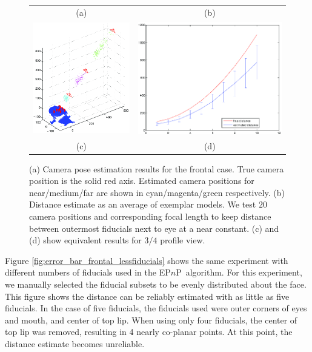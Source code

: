 \documentclass[runningheads]{llncs}
\newcommand {\EPnP} {EP$n$P}
\begin{document}
\begin{figure}[ht]
\begin{tabular}{cc}
(a) & (b) \\
\includegraphics[width=.5\linewidth]{resources/figures/cameraloc_3q.png} &
\includegraphics[width=.5\linewidth]{resources/figures/errorbar_3q.png} \\
(c) & (d)
\end{tabular}
\caption{	
(a) Camera pose estimation results for the frontal case.  
True camera position is the solid red axis.  
Estimated camera positions for near/medium/far are shown in cyan/magenta/green respectively.   
(b) Distance estimate as an average of exemplar models.  
We test $20$ camera positions and corresponding focal length to keep distance between outermost fiducials next to eye at a near constant. 
(c) and (d) show equivalent results for $3/4$ profile view.}
\label{fig:results}
\end{figure}

Figure \ref{fig:error_bar_frontal_lessfiducials} shows the same experiment with different numbers of fiducials used in the \EPnP~algorithm.  For this experiment, we manually selected the fiducial subsets to be evenly distributed about the face.  This figure shows the distance can be reliably estimated with as little as five fiducials.  In the case of five fiducials, the fiducials used were outer corners of eyes and mouth, and center of top lip.  When using only four fiducials, the center of top lip was removed, resulting in 4 nearly co-planar points.  At this point, the distance estimate becomes unreliable.
\end{document}

